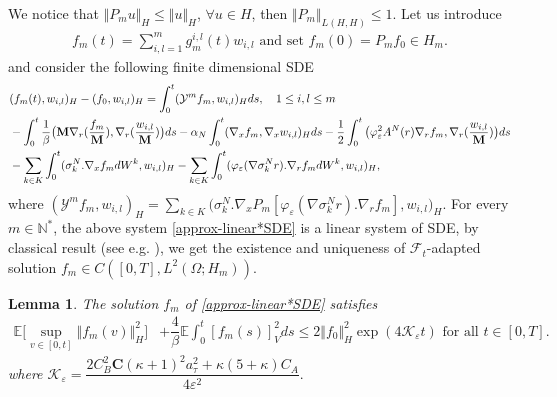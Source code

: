 \documentclass[a4paper,12pt, reqno]{amsart}
\newcommand{\E}{\ensuremath{\mathbb{E}}}
\newtheorem{lemma}[theorem]{Lemma}
\begin{document}
	We 	notice	that	$\Vert	P_mu\Vert_H\leq\Vert	u\Vert_H$, $\forall u\in H$,
	then 	$\Vert	P_m\Vert_{L(H,H)}\leq	1$.
			Let us introduce
    \begin{align}\label{approximation-seq}
         f_m(t)=\displaystyle\sum_{i,l=1}^mg^{i,l}_m(t)w_{i,l} \text{ and set }
	f_m(0)=P_mf_0\in H_m. 
    \end{align}
 		 and 	consider	the	following	finite	dimensional	SDE
\begin{align}\label{approx-linear*SDE}
    &(f_m(t),w_{i,l})_H-(f_{0},w_{i,l})_H=\int_0^t(\mathcal{Y}^mf_m,w_{i,l})_Hds, \quad 1\leq i,l \leq m \\
    &	-\int_0^t\dfrac{1}{\beta}\big(\mathbf{M}\nabla_r(\dfrac{f_m}{\mathbf{M}}),\nabla_r(\dfrac{w_{i,l}}{\mathbf{M}})\big)ds -\alpha_N\int_0^t(\nabla_x f_m,\nabla_x w_{i,l})_Hds- \dfrac{1}{2}\int_0^t\big(\varphi_\varepsilon^2A^N(r) \nabla_rf_m,\nabla_r(\dfrac{w_{i,l}}{\mathbf{M}})\big)ds\notag\\
            &-\sum_{k\in K}\int_0^t(\sigma_k^N.\nabla_xf_mdW^k,w_{i,l})_H -\sum_{k\in K}\int_0^t(\varphi_\varepsilon(\nabla \sigma_k^Nr).\nabla_rf_m dW^k,w_{i,l})_H, \notag
\end{align}
where $
    (\mathcal{Y}^mf_m,w_{i,l})_H=\sum_{k\in K}\big(\sigma_k^N.\nabla_x P_m[\varphi_\varepsilon (\nabla \sigma_k^Nr).\nabla_rf_m],w_{i,l}\big)_H.$
	For every $m\in \mathbb{N}^*$, 	the above system \eqref{approx-linear*SDE}   is   a   linear system  of  SDE, by  classical result    (see    e.g.    \cite[Chapter   V]{Oksendal2013}),   we  get the existence and uniqueness of $\mathcal{F}_t$-adapted   solution    $f_m\in C([0,T],L^2(\Omega;H_m))$.
\begin{lemma}\label{sec:estimates}
The solution $f_m$ of \eqref{approx-linear*SDE} satisfies
    \begin{align}\label{key-est-Galerkin}
 \E\Big[\sup_{v\in[0,t]} \Vert f_m(v)\Vert_H^2  \Big]&+\dfrac{4}{\beta}\E\int_0^t [f_m(s)]_V^2ds\leq 2\Vert f_{0}\Vert_H^2\exp{(4\mathcal{K}_\varepsilon t)} \text{ for all } t\in [0,T].
\end{align}
where $\mathcal{K}_\varepsilon=\dfrac{2C_B^2\mathbf{C}(\kappa+1)^2 a_\tau^2+\kappa (5+\kappa)C_A}{4\varepsilon^2}.$
\end{lemma}
\end{document}
